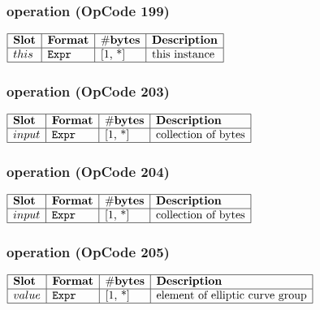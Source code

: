 \subsubsection{ operation (OpCode 199)}

\noindent
\(\begin{array}{| l | l | l | l |}
    \hline
    \bf{Slot} & \bf{Format} & \bf{\#bytes} & \bf{Description} \\
    \hline
         this & \lst{Expr} & \text{[1, *]} & \text{this instance} \\
    \hline
      
\end{array}\)
       

\subsubsection{ operation (OpCode 203)}

\noindent
\(\begin{array}{| l | l | l | l |}
    \hline
    \bf{Slot} & \bf{Format} & \bf{\#bytes} & \bf{Description} \\
    \hline
         input & \lst{Expr} & \text{[1, *]} & \text{collection of bytes} \\
    \hline
      
\end{array}\)
       

\subsubsection{ operation (OpCode 204)}

\noindent
\(\begin{array}{| l | l | l | l |}
    \hline
    \bf{Slot} & \bf{Format} & \bf{\#bytes} & \bf{Description} \\
    \hline
         input & \lst{Expr} & \text{[1, *]} & \text{collection of bytes} \\
    \hline
      
\end{array}\)
       

\subsubsection{ operation (OpCode 205)}

\noindent
\(\begin{array}{| l | l | l | l |}
    \hline
    \bf{Slot} & \bf{Format} & \bf{\#bytes} & \bf{Description} \\
    \hline
         value & \lst{Expr} & \text{[1, *]} & \text{element of elliptic curve group} \\
    \hline
      
\end{array}\)
       

